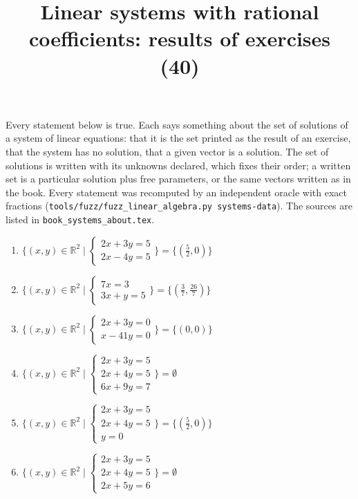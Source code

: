 \documentclass[11pt,a4paper]{article}
\title{Linear systems with rational coefficients: results of exercises (40)}
\author{}
\date{}
\begin{document}
\maketitle
Every statement below is true. Each says something about the set of solutions of a system of linear equations: that it is the set printed as the result of an exercise, that the system has no solution, that a given vector is a solution. The set of solutions is written with its unknowns declared, which fixes their order; a written set is a particular solution plus free parameters, or the same vectors written as in the book. Every statement was recomputed by an independent oracle with exact fractions (\texttt{tools/fuzz/fuzz\_linear\_algebra.py systems-data}). The sources are listed in \texttt{book\_systems\_about.tex}.

\begin{enumerate}
\item $\displaystyle \{(x, y) \in \mathbb{R}^{2} \mid \begin{cases} 2x + 3y = 5 \\ 2x - 4y = 5 \end{cases}\} = \{(\frac{5}{2}, 0)\}$
\item $\displaystyle \{(x, y) \in \mathbb{R}^{2} \mid \begin{cases} 7x = 3 \\ 3x + y = 5 \end{cases}\} = \{(\frac{3}{7}, \frac{26}{7})\}$
\item $\displaystyle \{(x, y) \in \mathbb{R}^{2} \mid \begin{cases} 2x + 3y = 0 \\ x - 41y = 0 \end{cases}\} = \{(0, 0)\}$
\item $\displaystyle \{(x, y) \in \mathbb{R}^{2} \mid \begin{cases} 2x + 3y = 5 \\ 2x + 4y = 5 \\ 6x + 9y = 7 \end{cases}\} = \emptyset$
\item $\displaystyle \{(x, y) \in \mathbb{R}^{2} \mid \begin{cases} 2x + 3y = 5 \\ 2x + 4y = 5 \\ y = 0 \end{cases}\} = \{(\frac{5}{2}, 0)\}$
\item $\displaystyle \{(x, y) \in \mathbb{R}^{2} \mid \begin{cases} 2x + 3y = 5 \\ 2x + 4y = 5 \\ 2x + 5y = 6 \end{cases}\} = \emptyset$

\end{enumerate}
\end{document}
